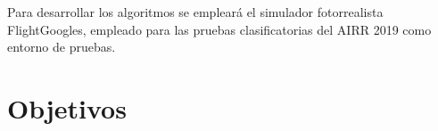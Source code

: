 Para desarrollar los algoritmos se empleará el simulador fotorrealista FlightGoogles, empleado para las pruebas clasificatorias del AIRR 2019 como entorno de pruebas.






 
\section{Objetivos}
